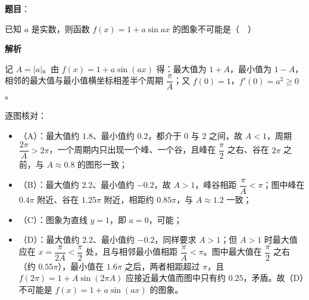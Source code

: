 \begin{answer}

\textbf{题目}：

已知 $a$ 是实数，则函数 $f(x)=1+a\sin ax$ 的图象不可能是（　）
\nopagebreak[4]
\begin{center}\end{center}
\nopagebreak[4]
\textbf{解析}

记 $A=|a|$。由 $f(x)=1+a\sin(ax)$ 得：最大值为 $1+A$，最小值为 $1-A$，相邻的最大值与最小值横坐标相差半个周期 $\dfrac{\pi}{A}$；又 $f(0)=1$，$f'(0)=a^2\geqslant0$。

逐图核对：

\begin{itemize}
\item （A）：最大值约 $1.8$、最小值约 $0.2$，都介于 $0$ 与 $2$ 之间，故 $A<1$，周期 $\dfrac{2\pi}{A}>2\pi$，一个周期内只出现一个峰、一个谷，且峰在 $\dfrac\pi2$ 之右、谷在 $2\pi$ 之前，与 $A\approx0.8$ 的图形一致；
\item （B）：最大值约 $2.2$、最小值约 $-0.2$，故 $A>1$，峰谷相距 $\dfrac{\pi}{A}<\pi$；图中峰在 $0.4\pi$ 附近、谷在 $1.25\pi$ 附近，相距约 $0.85\pi$，与 $A\approx1.2$ 一致；
\item （C）：图象为直线 $y=1$，即 $a=0$，可能；
\item （D）：最大值约 $2.2$、最小值约 $-0.2$，同样要求 $A>1$；但 $A>1$ 时最大值应在 $x=\dfrac{\pi}{2A}<\dfrac\pi2$ 处，且与相邻最小值相距 $\dfrac{\pi}{A}<\pi$。图中最大值在 $\dfrac\pi2$ 之右（约 $0.55\pi$），最小值在 $1.6\pi$ 之后，两者相距超过 $\pi$，且 $f(2\pi)=1+A\sin(2\pi A)$ 应接近最大值而图中只有约 $0.25$，矛盾。故（D）不可能是 $f(x)=1+a\sin(ax)$ 的图象。
\end{itemize}


\end{answer}
